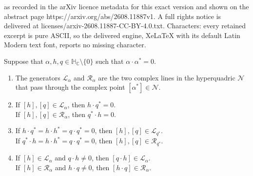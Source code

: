 \documentclass[10pt,a4paper]{amsart}
\newcommand{\C}{\mathbb{C}}
\newcommand{\HC}{\mathbb{H}_{\C}}
\newcommand{\cL}{\mathcal{L}}
\newcommand{\cN}{\mathcal{N}}
\newcommand{\cR}{\mathcal{R}}
\newenvironment{claims}{\begin{enumerate}[topsep=0pt,itemsep=0pt,leftmargin=8mm,label=\textnormal{\textbf{(\alph*)}},ref=(\alph*)]}{\end{enumerate}}
\begin{document}
as recorded in the arXiv licence metadata for this exact version and shown on the abstract page https://arxiv.org/abs/2608.11887v1. A full rights notice is delivered at licenses/arxiv-2608.11887-CC-BY-4.0.txt. Characters: every retained excerpt is pure ASCII, so the delivered engine, XeLaTeX with its default Latin Modern text font, reports no missing character.
\begin{lemma}
\label{lem:N}
Suppose that $\alpha,h,q\in\HC\setminus\{0\}$ such that $\alpha\cdot\alpha^*=0$.
\begin{claims}
\item\label{lem:N:a}
The generators $\cL_\alpha$ and $\cR_\alpha$ are the two complex lines in the hyperquadric $\cN$
that pass through the complex point $[\alpha^*]\in\cN$.

\item\label{lem:N:b}
If $[h],[q]\in \cL_\alpha$, then $h\cdot q^*=0$.\\
If $[h],[q]\in \cR_\alpha$, then $q^*\cdot h=0$.

\item\label{lem:N:c}
If $h\cdot q^*=h\cdot h^*=q\cdot q^*=0$, then $[h],[q]\in \cL_{q^*}$.\\
If $q^*\cdot h=h\cdot h^*=q\cdot q^*=0$, then $[h],[q]\in \cR_{q^*}$.


\item\label{lem:N:d}
If $[h]\in\cL_\alpha$ and $q\cdot h\neq 0$, then $[q\cdot h]\in \cL_\alpha$.\\
If $[h]\in\cR_\alpha$ and $h\cdot q\neq 0$, then $[h\cdot q]\in \cR_\alpha$.
\end{claims}
\end{lemma}
\end{document}
